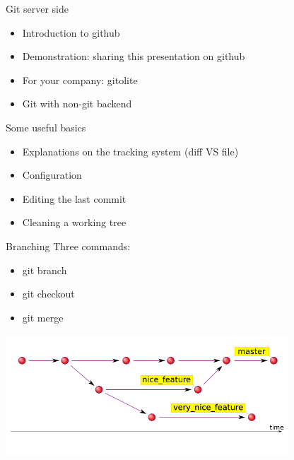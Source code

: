 \documentclass{beamer}
\begin{document}
\begin{frame}{Git server side}
    \begin{itemize}
        \item Introduction to github
        \pause
        \item Demonstration: sharing this presentation on github
        \pause
        \item For your company: gitolite
        \pause
        \item Git with non-git backend
    \end{itemize}
\end{frame}

\begin{frame}{Some useful basics}
    \begin{itemize}
        \item Explanations on the tracking system (diff VS file)
        \pause
        \item Configuration
        \pause
        \item Editing the last commit
        \pause
        \item Cleaning a working tree
    \end{itemize}
\end{frame}

\begin{frame}{Branching}
    Three commands: \\
    \begin{itemize}
        \item git branch
        \item git checkout
        \item git merge
    \end{itemize}
    \includegraphics[width=300pt,height=130pt]{branches.png}
\end{frame}
\end{document}
